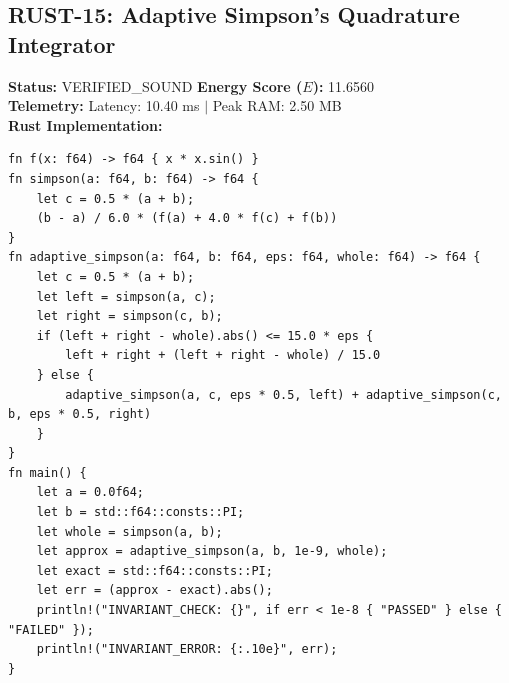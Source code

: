\documentclass[11pt, a4paper]{article}
\begin{document}
\subsection{RUST-15: Adaptive Simpson's Quadrature Integrator}
\textbf{Status:} VERIFIED\_SOUND \hfill \textbf{Energy Score ($E$):} 11.6560\\
\textbf{Telemetry:} Latency: 10.40 ms $|$ Peak RAM: 2.50 MB\\
\textbf{Rust Implementation:}
\begin{verbatim}
fn f(x: f64) -> f64 { x * x.sin() }
fn simpson(a: f64, b: f64) -> f64 {
    let c = 0.5 * (a + b);
    (b - a) / 6.0 * (f(a) + 4.0 * f(c) + f(b))
}
fn adaptive_simpson(a: f64, b: f64, eps: f64, whole: f64) -> f64 {
    let c = 0.5 * (a + b);
    let left = simpson(a, c);
    let right = simpson(c, b);
    if (left + right - whole).abs() <= 15.0 * eps {
        left + right + (left + right - whole) / 15.0
    } else {
        adaptive_simpson(a, c, eps * 0.5, left) + adaptive_simpson(c, b, eps * 0.5, right)
    }
}
fn main() {
    let a = 0.0f64;
    let b = std::f64::consts::PI;
    let whole = simpson(a, b);
    let approx = adaptive_simpson(a, b, 1e-9, whole);
    let exact = std::f64::consts::PI;
    let err = (approx - exact).abs();
    println!("INVARIANT_CHECK: {}", if err < 1e-8 { "PASSED" } else { "FAILED" });
    println!("INVARIANT_ERROR: {:.10e}", err);
}
\end{verbatim}
\end{document}

